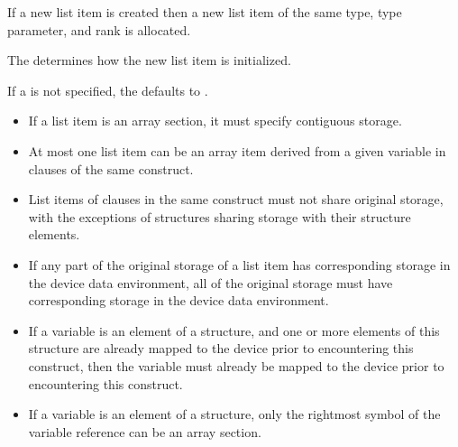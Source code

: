 \fortranspecificstart
If a new list item is created then a new list item of the same type, type parameter, and
rank is allocated.
\fortranspecificend

The  determines how the new list item is initialized.

If a  is not specified, the  defaults to .

\restrictions
\begin{itemize}
\item If a list item is an array section, it must specify contiguous storage.

\item At most one list item can be an array item derived from a given variable in 
clauses of the same construct.


\item List items of  clauses in the same construct must not share original storage, with the exceptions of structures sharing storage with their structure elements.

\item If any part of the original storage of a list item has corresponding storage in the device data environment, all of the original storage must have corresponding storage in the device data environment. 


\item If a variable is an element of a structure, and one or more elements of this structure are already mapped to the device prior to encountering this construct, then the variable must already be mapped to the device prior to encountering this construct.

\item If a variable is an element of a structure, only the rightmost  symbol of the variable reference can be an array section.


\end{itemize}

